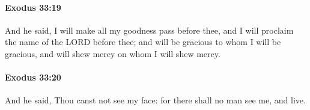 		\paragraph{Exodus 33:19} %
			\label{EXODUS-33-19}

			And he said, I will make all my goodness pass before thee, and I will proclaim the name of the LORD before thee; and will be gracious to whom I will be gracious, and will shew mercy on whom I will shew mercy.


		\paragraph{Exodus 33:20} %
			\label{EXODUS-33-20}

			And he said, Thou canst not see my face: for there shall no man see me, and live.


